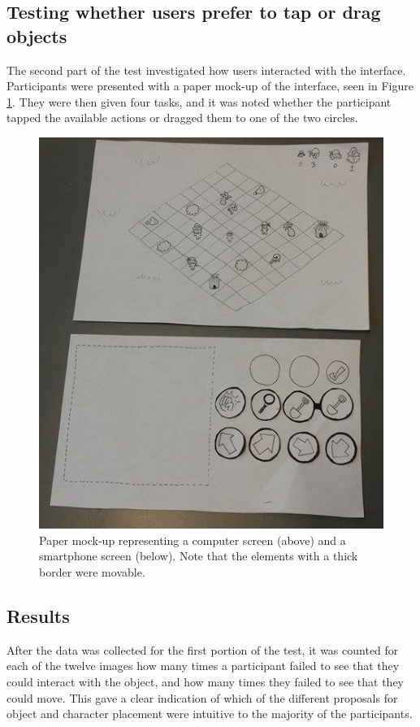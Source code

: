 \subsection{Testing whether users prefer to tap or drag objects}
The second part of the test investigated how users interacted with the interface. Participants were presented with a paper mock-up of the interface, seen in Figure \ref{fig:mockup}. They were then given four tasks, and it was noted whether the participant tapped the available actions or dragged them to one of the two circles.

\begin{figure}[h!]
	\centering
	\includegraphics[scale=0.7]{figures/paper_1.jpg}
	\caption{Paper mock-up representing a computer screen (above) and a smartphone screen (below). Note that the elements with a thick border were movable. \label{fig:mockup}}
\end{figure}

\subsection{Results}
After the data was collected for the first portion of the test, it was counted for each of the twelve images how many times a participant failed to see that they could interact with the object, and how many times they failed to see that they could move. This gave a clear indication of which of the different proposals for object and character placement were intuitive to the majority of the participants.

